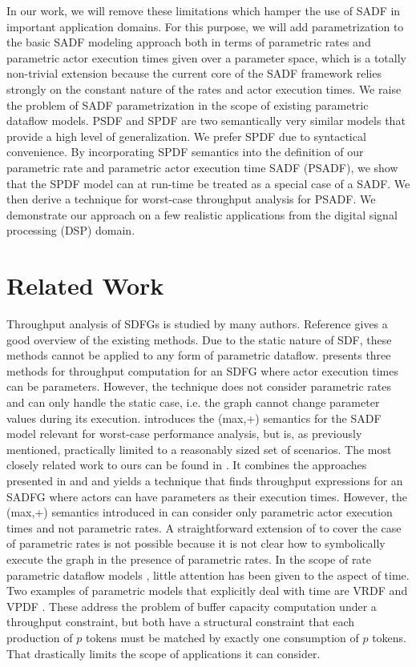 \documentclass[]{eptcs}
\begin{document}
In our work, we will remove these limitations which hamper the use of SADF in important application domains. For this purpose, we will add parametrization to the basic SADF modeling approach both in terms of parametric rates and parametric actor execution times given over a parameter space, which is a totally non-trivial extension because the current core of the SADF framework relies strongly on the constant nature of the rates and actor execution times. We raise the problem of SADF parametrization in the scope of existing parametric dataflow models. PSDF \cite{2bhatt:all} and SPDF \cite{2frad:all} are two semantically very similar models that provide a high level of generalization. We prefer SPDF due to syntactical convenience. By incorporating SPDF semantics into the definition of our parametric rate and parametric actor execution time SADF (PSADF), we show that the SPDF model can at run-time be treated as a special case of a SADF. We then derive a technique for worst-case throughput analysis for PSADF. We demonstrate our approach on a few realistic applications from the digital signal processing (DSP) domain.
\section{Related Work}
Throughput analysis of SDFGs is studied by many authors. Reference \cite{2gha:all} gives a good overview of the existing methods. Due to the static nature of SDF, these methods cannot be applied to any form of parametric dataflow. \cite{3gha:all} presents three methods for throughput computation for an SDFG where actor execution times can be parameters. However, the technique does not consider parametric rates and can only handle the static case, i.e. the graph cannot change parameter values during its execution. \cite{2geil:all} introduces the (max,+) semantics for the SADF model relevant for worst-case performance analysis, but is, as previously mentioned, practically limited to a reasonably sized set of scenarios. The most closely related work to ours can be found in \cite{2dam:all}. It combines the approaches presented in \cite{2geil:all} and \cite{3gha:all} and yields a technique that finds throughput expressions for an SADFG where actors can have parameters as their execution times. However, the (max,+) semantics introduced in \cite{2dam:all} can consider only parametric actor execution times and not parametric rates. A straightforward extension of \cite{2dam:all} to cover the case of parametric rates is not possible because it is not clear how to symbolically execute the graph in the presence of parametric rates. In the scope of rate parametric dataflow models \cite{2bhatt:all}\cite{2frad:all}, little attention has been given to the aspect of time. Two examples of parametric models that explicitly deal with time are VRDF \cite{2wigg} and VPDF \cite{2wigg}. These address the problem of buffer capacity computation under a throughput constraint, but both have a structural constraint that each production of $p$ tokens must be matched by exactly one consumption of $p$ tokens. That drastically limits the scope of applications it can consider.
\end{document}
